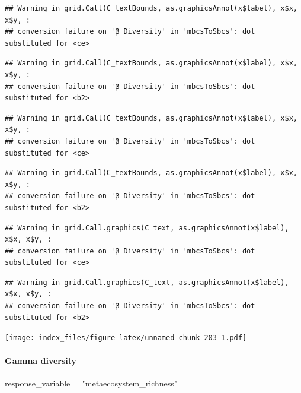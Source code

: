 \documentclass[
]{article}
\newenvironment{Shaded}{\begin{snugshade}}{\end{snugshade}}
\newcommand{\NormalTok}[1]{#1}
\newcommand{\OtherTok}[1]{\textcolor[rgb]{0.56,0.35,0.01}{#1}}
\newcommand{\StringTok}[1]{\textcolor[rgb]{0.31,0.60,0.02}{#1}}
\begin{document}
\begin{verbatim}
## Warning in grid.Call(C_textBounds, as.graphicsAnnot(x$label), x$x, x$y, :
## conversion failure on 'β Diversity' in 'mbcsToSbcs': dot substituted for <ce>
\end{verbatim}

\begin{verbatim}
## Warning in grid.Call(C_textBounds, as.graphicsAnnot(x$label), x$x, x$y, :
## conversion failure on 'β Diversity' in 'mbcsToSbcs': dot substituted for <b2>
\end{verbatim}

\begin{verbatim}
## Warning in grid.Call(C_textBounds, as.graphicsAnnot(x$label), x$x, x$y, :
## conversion failure on 'β Diversity' in 'mbcsToSbcs': dot substituted for <ce>
\end{verbatim}

\begin{verbatim}
## Warning in grid.Call(C_textBounds, as.graphicsAnnot(x$label), x$x, x$y, :
## conversion failure on 'β Diversity' in 'mbcsToSbcs': dot substituted for <b2>
\end{verbatim}

\begin{verbatim}
## Warning in grid.Call.graphics(C_text, as.graphicsAnnot(x$label), x$x, x$y, :
## conversion failure on 'β Diversity' in 'mbcsToSbcs': dot substituted for <ce>
\end{verbatim}

\begin{verbatim}
## Warning in grid.Call.graphics(C_text, as.graphicsAnnot(x$label), x$x, x$y, :
## conversion failure on 'β Diversity' in 'mbcsToSbcs': dot substituted for <b2>
\end{verbatim}

\texttt{[image: index\_files/figure-latex/unnamed-chunk-203-1.pdf]}

\hypertarget{gamma-diversity-1}{%
\paragraph{Gamma diversity}\label{gamma-diversity-1}}

\begin{Shaded}
\begin{Highlighting}[]
\NormalTok{response\_variable }\OtherTok{=} \StringTok{"metaecosystem\_richness"}
\end{Highlighting}
\end{Shaded}
\end{document}
